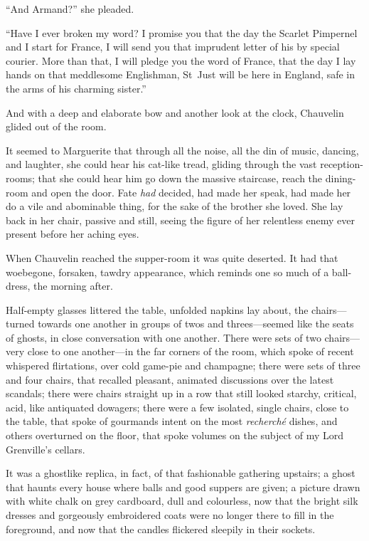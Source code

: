 \enquote{And Armand?} she pleaded.

\enquote{Have I ever broken my word? I promise you that the day the Scarlet Pimpernel and I start for France, I will send you that imprudent letter of his by special courier. More than that, I will pledge you the word of France, that the day I lay hands on that meddlesome Englishman, St~Just will be here in England, safe in the arms of his charming sister.}

And with a deep and elaborate bow and another look at the clock, Chauvelin glided out of the room.

It seemed to Marguerite that through all the noise, all the din of music, dancing, and laughter, she could hear his cat-like tread, gliding through the vast reception-rooms; that she could hear him go down the massive staircase, reach the dining-room and open the door. Fate \textit{had} decided, had made her speak, had made her do a vile and abominable thing, for the sake of the brother she loved. She lay back in her chair, passive and still, seeing the figure of her relentless enemy ever present before her aching eyes.

When Chauvelin reached the supper-room it was quite deserted. It had that woebegone, forsaken, tawdry appearance, which reminds one so much of a ball-dress, the morning after.

Half-empty glasses littered the table, unfolded napkins lay about, the chairs---turned towards one another in groups of twos and threes---seemed like the seats of ghosts, in close conversation with one another. There were sets of two chairs---very close to one another---in the far corners of the room, which spoke of recent whispered flirtations, over cold game-pie and champagne; there were sets of three and four chairs, that recalled pleasant, animated discussions over the latest scandals; there were chairs straight up in a row that still looked starchy, critical, acid, like antiquated dowagers; there were a few isolated, single chairs, close to the table, that spoke of gourmands intent on the most \textit{recherché} dishes, and others overturned on the floor, that spoke volumes on the subject of my Lord Grenville's cellars.

It was a ghostlike replica, in fact, of that fashionable gathering upstairs; a ghost that haunts every house where balls and good suppers are given; a picture drawn with white chalk on grey cardboard, dull and colourless, now that the bright silk dresses and gorgeously embroidered coats were no longer there to fill in the foreground, and now that the candles flickered sleepily in their sockets.

